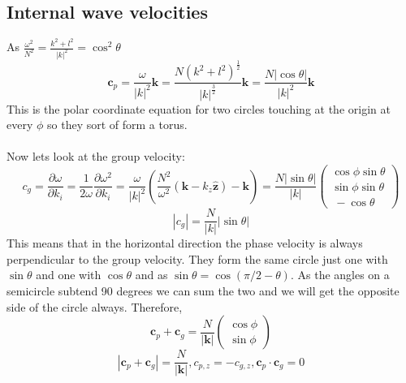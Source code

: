 \documentclass{article}
\begin{document}
\subsection{Internal wave velocities}
As $\frac{\omega^2}{N^2} = \frac{k^2 + l^2}{|k|^2} = \cos^2 \theta$
$$
\bm c_p = \frac{\omega}{|k|^2} \bm k = \frac{ N( k^2 + l^2)^{\frac{1}{2}}}{|k|^{\frac{3}{2}}} \bm k = \frac{N |\cos \theta|}{|k|^2} \bm k 
$$
This is the polar coordinate equation for two circles touching at the origin at every $\phi$ so they sort of form a torus.\\\\
Now lets look at the group velocity:
$$
c_g = \frac{\partial \omega}{\partial k_i} = \frac{1}{2\omega} \frac{\partial \omega^2}{\partial k_i} = \frac{\omega}{|k|^2} ( \frac{N^2}{\omega^2}(\bm k - k_z \hat{\bm z}) - \bm k) = \frac{N|\sin \theta|}{|k|}\begin{pmatrix}\cos \phi \sin \theta\\ \sin \phi \sin \theta \\\ - \cos \theta \end{pmatrix}
$$
$$
|c_g| = \frac{N}{|k|} |\sin \theta|
$$
This means that in the horizontal direction the phase velocity is always perpendicular to the group velocity. They form the same circle just one with $\sin \theta$ and one with $\cos \theta$ and as $\sin \theta = \cos (\pi/2 - \theta)$. As the angles on a semicircle subtend 90 degrees we can sum the two and we will get the opposite side of the circle always. Therefore,
$$
\bm c_p + \bm c_g = \frac{N}{|\bm k|} \begin{pmatrix} \cos \phi\\ \sin \phi \end{pmatrix}
$$
$$
|\bm c_p + \bm c_g| = \frac{N}{|\bm k|}, c_{p,z} = - c_{g,z}, \bm c_p \cdot \bm c_g = 0
$$
\end{document}
